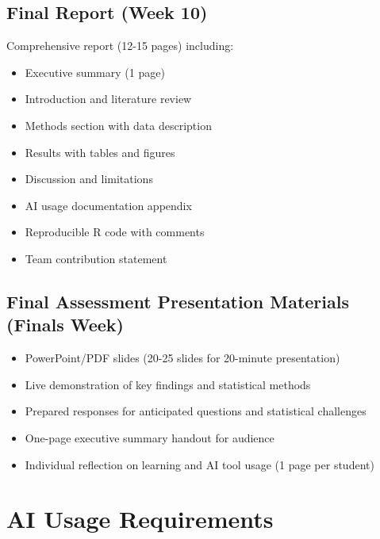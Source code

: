 \documentclass[11pt]{article}
\begin{document}
\subsection{Final Report (Week 10)}
Comprehensive report (12-15 pages) including:
\begin{itemize}
\item Executive summary (1 page)
\item Introduction and literature review
\item Methods section with data description
\item Results with tables and figures
\item Discussion and limitations
\item AI usage documentation appendix
\item Reproducible R code with comments
\item Team contribution statement
\end{itemize}

\subsection{Final Assessment Presentation Materials (Finals Week)}
\begin{itemize}
\item PowerPoint/PDF slides (20-25 slides for 20-minute presentation)
\item Live demonstration of key findings and statistical methods
\item Prepared responses for anticipated questions and statistical challenges
\item One-page executive summary handout for audience
\item Individual reflection on learning and AI tool usage (1 page per student)
\end{itemize}

\section{AI Usage Requirements}
\end{document}
